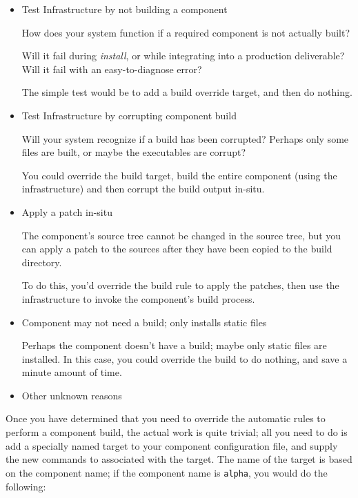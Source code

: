 \begin{itemize}
\item Test \bni Infrastructure by not building a component

  How does your \bni system function if a required component is not
  actually built?

  Will it fail during \emph{install}, or while integrating into a
  production deliverable?  Will it fail with an easy-to-diagnose
  error?

  The simple test would be to add a build override target, and then do
  nothing.

\item Test \bni Infrastructure by corrupting component build

  Will your \bni system recognize if a build has been corrupted?
  Perhaps only some files are built, or maybe the executables are
  corrupt?

  You could override the build target, build the entire component
  (using the \lmsbw infrastructure) and then corrupt the build output
  in-situ.

\item Apply a patch in-situ

  The component's source tree cannot be changed in the source tree,
  but you can apply a patch to the sources after they have been copied to the build
  directory.

  To do this, you'd override the build rule to apply the patches, then
  use the \lmsbw infrastructure to invoke the component's build
  process.

\item Component may not need a build; only installs static files

  Perhaps the component doesn't have a build; maybe only static files
  are installed.  In this case, you could override the build to do
  nothing, and save a minute amount of time.

\item Other unknown reasons
\end{itemize}

Once you have determined that you need to override the automatic rules
to perform a component build, the actual work is quite trivial; all
you need to do is add a specially named \makefile target to your
component configuration file, and supply the new commands to
associated with the target.  The name of the target is based on the
component name; if the component name is \texttt{alpha}, you would do
the following:

